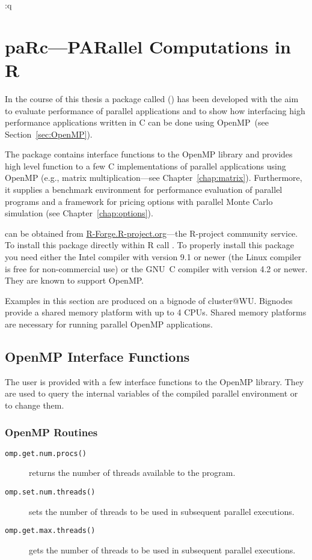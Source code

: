 
:q\section{paRc---PARallel Computations in R}
\label{sec:paRc}

In the course of this thesis a package called 
(\cite{theussl07paRc}) has been developed with the aim
to evaluate performance of parallel applications and to show how
interfacing high performance applications written in C can be done
using OpenMP~(see Section~\ref{sec:OpenMP}).

The package  contains interface functions to the OpenMP library
and provides high level function to a few C implementations of
parallel applications using OpenMP (e.g., matrix multiplication---see
Chapter~\ref{chap:matrix}).
Furthermore, it supplies a benchmark environment for performance
evaluation of parallel programs and a framework for pricing options
with parallel Monte Carlo simulation (see
Chapter~\ref{chap:options}).

 can be obtained from \url{R-Forge.R-project.org}---the
R-project community service. To install this package directly within R
call .
To properly install this package you need either the Intel compiler
with version 9.1 or newer (the Linux compiler is free for
non-commercial use) or the GNU~C compiler with version 4.2 or
newer. They are known to support OpenMP.

Examples in this section are produced on a bignode of
cluster@WU. Bignodes provide a shared memory platform with up to 4
CPUs. Shared memory platforms are necessary for running parallel
OpenMP applications.

\subsection{OpenMP Interface Functions}

The user is provided with a few interface functions to the OpenMP
library. They are used to query the internal variables of the compiled
parallel environment or to change them.

\subsubsection{OpenMP Routines}
\begin{description}
\item[\texttt{omp.get.num.procs()}] returns the number of threads
  available to the program.
\item[\texttt{omp.set.num.threads()}] sets the number of threads to be
  used in subsequent parallel executions.
\item[\texttt{omp.get.max.threads()}] gets the number of threads to be
  used in subsequent parallel executions.
\end{description}

